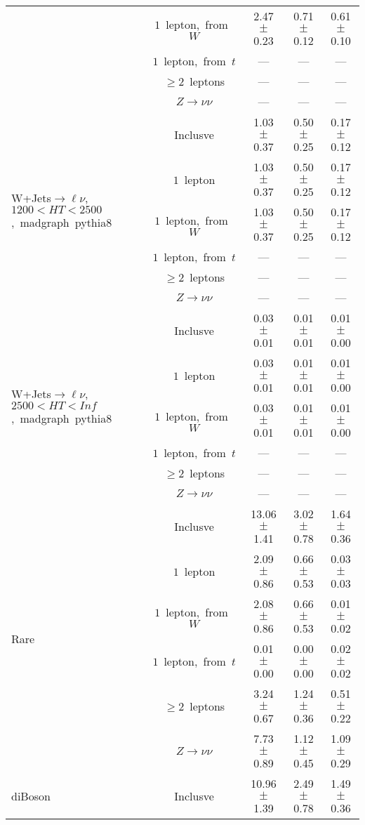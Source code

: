 \documentclass{article}
\begin{document}
\begin{longtable}{|l|c|c|c|c|}
 & $1$~lepton,~from~$W$  & 2.47 $\pm$ 0.23  & 0.71 $\pm$ 0.12  & 0.61 $\pm$ 0.10 \\* 
 & $1$~lepton,~from~$t$  & ---  & ---  & --- \\* 
 & $\ge2$~leptons  & ---  & ---  & --- \\* 
 & $Z\rightarrow\nu\nu$  & ---  & ---  & --- \\* 
\hline 
\multirow{6}{*}{W+Jets$\rightarrow\ell\nu$,~$1200<HT<2500$,~madgraph~pythia8} & Inclusve  & 1.03 $\pm$ 0.37  & 0.50 $\pm$ 0.25  & 0.17 $\pm$ 0.12 \\* 
 & $1$~lepton  & 1.03 $\pm$ 0.37  & 0.50 $\pm$ 0.25  & 0.17 $\pm$ 0.12 \\* 
 & $1$~lepton,~from~$W$  & 1.03 $\pm$ 0.37  & 0.50 $\pm$ 0.25  & 0.17 $\pm$ 0.12 \\* 
 & $1$~lepton,~from~$t$  & ---  & ---  & --- \\* 
 & $\ge2$~leptons  & ---  & ---  & --- \\* 
 & $Z\rightarrow\nu\nu$  & ---  & ---  & --- \\* 
\hline 
\multirow{6}{*}{W+Jets$\rightarrow\ell\nu$,~$2500<HT<Inf$,~madgraph~pythia8} & Inclusve  & 0.03 $\pm$ 0.01  & 0.01 $\pm$ 0.01  & 0.01 $\pm$ 0.00 \\* 
 & $1$~lepton  & 0.03 $\pm$ 0.01  & 0.01 $\pm$ 0.01  & 0.01 $\pm$ 0.00 \\* 
 & $1$~lepton,~from~$W$  & 0.03 $\pm$ 0.01  & 0.01 $\pm$ 0.01  & 0.01 $\pm$ 0.00 \\* 
 & $1$~lepton,~from~$t$  & ---  & ---  & --- \\* 
 & $\ge2$~leptons  & ---  & ---  & --- \\* 
 & $Z\rightarrow\nu\nu$  & ---  & ---  & --- \\* 
\hline 
\multirow{6}{*}{Rare} & Inclusve  & 13.06 $\pm$ 1.41  & 3.02 $\pm$ 0.78  & 1.64 $\pm$ 0.36 \\* 
 & $1$~lepton  & 2.09 $\pm$ 0.86  & 0.66 $\pm$ 0.53  & 0.03 $\pm$ 0.03 \\* 
 & $1$~lepton,~from~$W$  & 2.08 $\pm$ 0.86  & 0.66 $\pm$ 0.53  & 0.01 $\pm$ 0.02 \\* 
 & $1$~lepton,~from~$t$  & 0.01 $\pm$ 0.00  & 0.00 $\pm$ 0.00  & 0.02 $\pm$ 0.02 \\* 
 & $\ge2$~leptons  & 3.24 $\pm$ 0.67  & 1.24 $\pm$ 0.36  & 0.51 $\pm$ 0.22 \\* 
 & $Z\rightarrow\nu\nu$  & 7.73 $\pm$ 0.89  & 1.12 $\pm$ 0.45  & 1.09 $\pm$ 0.29 \\* 
\hline 
\multirow{6}{*}{diBoson} & Inclusve  & 10.96 $\pm$ 1.39  & 2.49 $\pm$ 0.78  & 1.49 $\pm$ 0.36 \\* 

\end{longtable}
\end{document}

